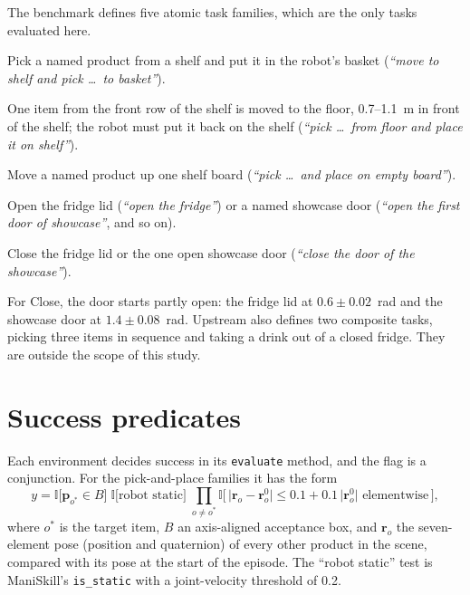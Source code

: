 The benchmark defines five atomic task families, which are the only tasks evaluated here.

\begin{description}[leftmargin=2em,style=nextline,itemsep=0.25em]
\item[Basket] Pick a named product from a shelf and put it in the robot's basket (\emph{``move to shelf and pick \ldots\ to basket''}).
\item[Floor] One item from the front row of the shelf is moved to the floor, 0.7--1.1~m in front of the shelf; the robot must put it back on the shelf (\emph{``pick \ldots\ from floor and place it on shelf''}).
\item[Board] Move a named product up one shelf board (\emph{``pick \ldots\ and place on empty board''}).
\item[Open] Open the fridge lid (\emph{``open the fridge''}) or a named showcase door (\emph{``open the first door of showcase''}, and so on).
\item[Close] Close the fridge lid or the one open showcase door (\emph{``close the door of the showcase''}).
\end{description}

For Close, the door starts partly open: the fridge lid at $0.6\pm0.02$~rad and the showcase door at $1.4\pm0.08$~rad. Upstream also defines two composite tasks, picking three items in sequence and taking a drink out of a closed fridge. They are outside the scope of this study.

\section{Success predicates}
\label{sec:predicates}

Each environment decides success in its \texttt{evaluate} method, and the flag is a conjunction. For the pick-and-place families it has the form
\begin{equation}
  y = \mathbb{I}\big[\mathbf{p}_{o^*} \in B\big]\;
      \mathbb{I}\big[\text{robot static}\big]\;
      \prod_{o \neq o^*} \mathbb{I}\big[\,\lvert \mathbf{r}_o - \mathbf{r}_o^{0}\rvert \le 0.1 + 0.1\,\lvert\mathbf{r}_o^{0}\rvert \text{ elementwise}\,\big],
  \label{eq:predicate-success}
\end{equation}
where $o^*$ is the target item, $B$ an axis-aligned acceptance box, and $\mathbf{r}_o$ the seven-element pose (position and quaternion) of every other product in the scene, compared with its pose at the start of the episode. The ``robot static'' test is ManiSkill's \texttt{is\_static} with a joint-velocity threshold of 0.2.

